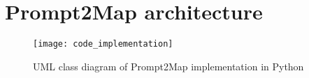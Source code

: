 
%


\chapter{Prompt2Map architecture}
\label{app:python_implementation}

\begin{figure}[htbp]
    \centering
    \texttt{[image: code\_implementation]}
    \caption{UML class diagram of Prompt2Map implementation in Python}
    \label{fig:Figures_Tree_silhouettes-vectorial}
  \end{figure}
  
